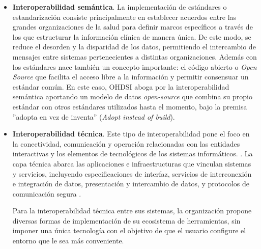 \begin{itemize}

    \item \textbf{Interoperabilidad semántica}. La implementación de estándares o estandarización consiste principalmente en establecer acuerdos entre las grandes organizaciones de la salud para definir marcos específicos a través de los que estructurar la información clínica de manera única. De este modo, se reduce el desorden y la disparidad de los datos, permitiendo el intercambio de mensajes entre sistemas pertenecientes a distintas organizaciones. 
    Además con los estándares nace también un concepto importante: el código abierto o \textit{Open Source} que facilita el acceso libre a la información y permitir consensuar un estándar común.
   En este caso, OHDSI aboga por la interoperabilidad semántica aportando un modelo de datos \textit{open-source} que combina su propio estándar con otros estándares utilizados hasta el momento, bajo la premisa ''adopta en vez de inventa'' (\textit{Adopt instead of build}).

    \item \textbf{Interoperabilidad técnica}. Este tipo de interoperabilidad pone el foco en la conectividad, comunicación y operación relacionadas con las entidades interactivas y los elementos de tecnológicos de los sistemas informáticos. \cite{santos2021interoperability}. La capa técnica abarca las aplicaciones e infraestructuras que vinculan sistemas y servicios, incluyendo especificaciones de interfaz, servicios de interconexión e integración de datos, presentación y intercambio de datos, y protocolos de comunicación segura \cite{leal2019interoperability}.

    Para la interoperabilidad técnica entre sus sistemas, la organización propone diversas formas de implementación de su ecosistema de herramientas, sin imponer una única tecnología con el objetivo de que el usuario configure el entorno que le sea más conveniente.
    

\end{itemize}

